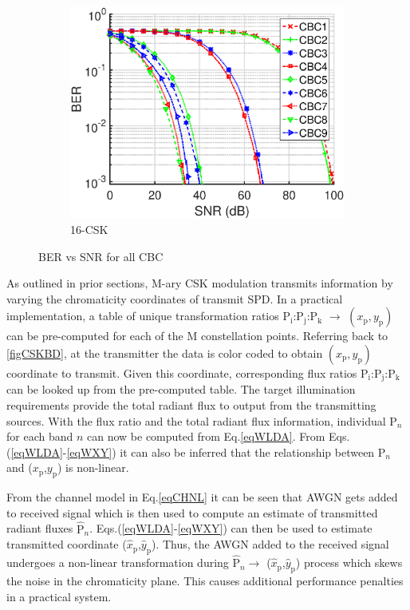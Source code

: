\documentclass[10pt,letterpaper]{article}
\begin{document}
\begin{figure}[t]
\begin{subfigure}{0.49\textwidth}
		\centering
			\includegraphics[trim={0.1in 0.0in 0.5in 0.3in}, clip=true, width=\textwidth]{M16_16-CSK_BERvsSNR_NL.eps}
			\caption{16-CSK}
			\label{fig16SNR_NL}
		\end{subfigure}
	\caption{BER vs SNR for all CBC}
	\label{figBERvsSNR_NL}
\end{figure}

As outlined in prior sections, M-ary CSK modulation transmits information by varying the chromaticity coordinates of transmit SPD. In a practical implementation, a table of unique transformation ratios P$_{\text{i}}$:P$_{\text{j}}$:P$_{\text{k}}$ $\rightarrow$ $(x_{\text{p}},y_{\text{p}})$ can be pre-computed {\color{red}for each of the M constellation points}. Referring back to \figurename\ref{figCSKBD}, at the transmitter the data is color coded to obtain $(x_{\text{p}},y_{\text{p}})$ coordinate to transmit. Given this coordinate, corresponding flux ratios P$_{\text{i}}$:P$_{\text{j}}$:P$_{\text{k}}$ can be looked up from the pre-computed table. The target illumination requirements provide the total radiant flux to output from the transmitting sources. With the flux ratio and the total radiant flux information, individual P$_{n}$ for each band $n$ can now be computed from Eq.\eqref{eqWLDA}. From Eqs.(\ref{eqWLDA}-\ref{eqWXY}) it can also be inferred that the relationship between P$_{n}$ and ($x_{\text{p}}$,$y_{\text{p}}$) is non-linear.

From the channel model in Eq.\eqref{eqCHNL} it can be seen that AWGN gets added to received signal which is then used to compute an estimate of transmitted radiant fluxes $\hat{\text{P}}_{n}$. Eqs.(\ref{eqWLDA}-\ref{eqWXY}) can then be used to estimate transmitted coordinate ($\hat{x}_{\text{p}}$,$\hat{y}_{\text{p}}$). Thus, the AWGN added to the received signal undergoes a non-linear transformation during $\hat{\text{P}}_{n}\rightarrow$ ($\hat{x}_{\text{p}}$,$\hat{y}_{\text{p}}$) process which skews the noise in the chromaticity plane. This causes additional performance penalties in a practical system.
\end{document}
